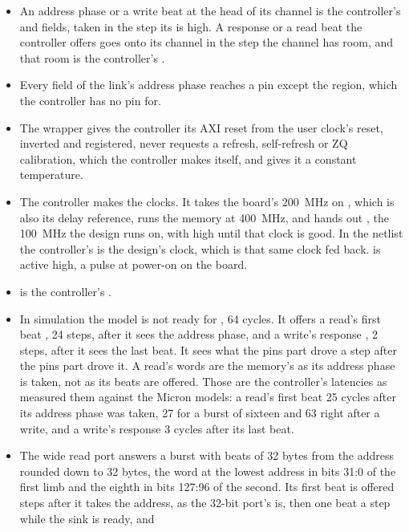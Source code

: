 \begin{itemize}
\item An address phase or a write beat at the head of its channel is
the controller's  and fields, taken in the step its
 is high. A response or a read beat the controller offers
goes onto its channel in the step the channel has room, and that room
is the controller's .
\item Every field of the link's address phase reaches a pin except the
region, which the controller has no pin for.
\item The wrapper gives the controller its AXI reset from the user
clock's reset, inverted and registered, never requests a refresh,
self-refresh or ZQ calibration, which the controller makes itself, and
gives it a constant temperature.
\item The controller makes the clocks. It takes the board's 200~MHz on
, which is also its delay reference, runs the memory
at 400~MHz, and hands out , the 100~MHz the design
runs on, with  high until that clock is good. In the
netlist the controller's  is the design's clock,
which is that same clock fed back.  is active high, a
pulse at power-on on the board.
\item {} is the controller's .
\item In simulation the model is not ready for ,
64 cycles. It offers a read's first beat ,
24 steps, after it sees the address phase, and a write's response
, 2 steps, after it sees the last beat. It
sees what the pins part drove a step after the pins part drove it. A
read's words are the memory's as its address phase is taken, not as
its beats are offered.
Those are the controller's latencies as 
measured them against the Micron models: a read's first beat 25
cycles after its address phase was taken, 27 for a burst of sixteen
and 63 right after a write, and a write's response 3 cycles after its
last beat.
\item The wide read port answers a burst with  beats of
32 bytes from the address rounded down to 32 bytes, the word at the
lowest address in bits 31:0 of the first limb and the eighth in bits
127:96 of the second. Its first beat is offered
 steps after it takes the address, as the
32-bit port's is, then one beat a step while the sink is ready, and

\end{itemize}
